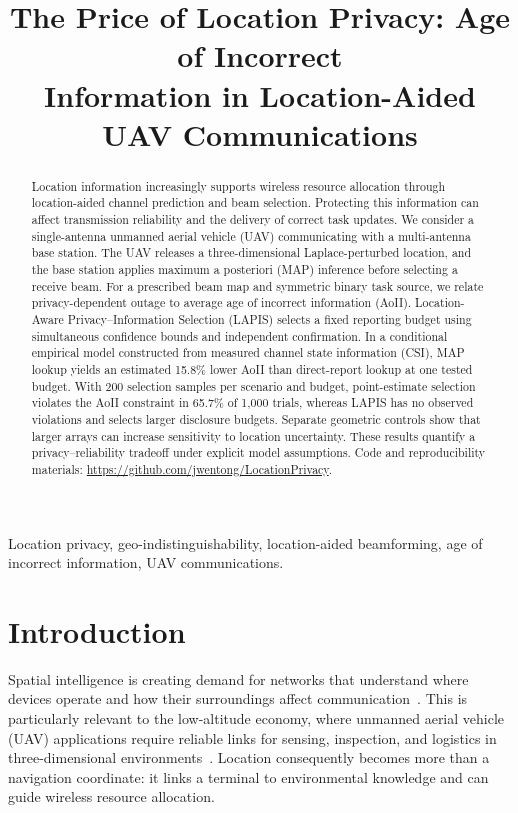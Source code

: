 \documentclass[conference]{IEEEtran}
\begin{document}
\title{\fontsize{22}{26}\selectfont
The Price of Location Privacy: Age of Incorrect\\
Information in Location-Aided UAV Communications}

\author{}

\maketitle

\begin{abstract}
Location information increasingly supports wireless resource allocation through location-aided channel prediction and beam selection. Protecting this information can affect transmission reliability and the delivery of correct task updates. We consider a single-antenna unmanned aerial vehicle (UAV) communicating with a multi-antenna base station. The UAV releases a three-dimensional Laplace-perturbed location, and the base station applies maximum a posteriori (MAP) inference before selecting a receive beam. For a prescribed beam map and symmetric binary task source, we relate privacy-dependent outage to average age of incorrect information (AoII). Location-Aware Privacy--Information Selection (LAPIS) selects a fixed reporting budget using simultaneous confidence bounds and independent confirmation. In a conditional empirical model constructed from measured channel state information (CSI), MAP lookup yields an estimated 15.8\% lower AoII than direct-report lookup at one tested budget. With 200 selection samples per scenario and budget, point-estimate selection violates the AoII constraint in 65.7\% of 1,000 trials, whereas LAPIS has no observed violations and selects larger disclosure budgets. Separate geometric controls show that larger arrays can increase sensitivity to location uncertainty. These results quantify a privacy--reliability tradeoff under explicit model assumptions. Code and reproducibility materials: \url{https://github.com/jwentong/LocationPrivacy}.
\end{abstract}

\begin{IEEEkeywords}
Location privacy, geo-indistinguishability, location-aided beamforming, age of incorrect information, UAV communications.
\end{IEEEkeywords}

\section{Introduction}
\label{sec:introduction}
Spatial intelligence is creating demand for networks that understand where devices operate and how their surroundings affect communication~\cite{wang2026spatial}. This is particularly relevant to the low-altitude economy, where unmanned aerial vehicle (UAV) applications require reliable links for sensing, inspection, and logistics in three-dimensional environments~\cite{jiang2023lae}. Location consequently becomes more than a navigation coordinate: it links a terminal to environmental knowledge and can guide wireless resource allocation.
\end{document}
